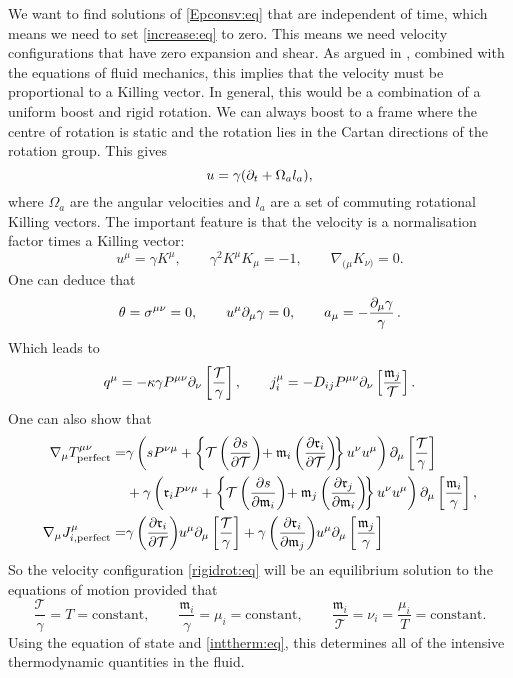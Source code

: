 \documentclass[12pt]{article}
\newcommand{\tloc}{\mathcal{T}}
\newcommand{\rl}{\mathfrak{r}}
\newcommand{\ml}{\mathfrak{m}}
\newcommand{\mg}{\mu}
\begin{document}
We want to find solutions of \eqref{Epconsv:eq} that are independent of time, which means we need to set \eqref{increase:eq} to zero.
This means we need velocity configurations that have zero expansion and shear.
As argued in \cite{Caldarelli:2008mv}, combined with the equations of fluid mechanics, this implies that the velocity must be proportional to a Killing vector.
In general, this would be a combination of a uniform boost and rigid rotation.
We can always boost to a frame where the centre of rotation is static and the rotation lies in the Cartan directions of the rotation group. This gives
%
\begin{equation}\label{rigidrot:eq}
  u = \gamma(\partial_t + \Omega_a l_a),
\end{equation}
%
where $\Omega_a$ are the angular velocities and $l_a$ are a set of commuting rotational Killing vectors. The important feature is that the velocity is a normalisation factor times a Killing vector:
%
\begin{equation}\label{eqvel:eq}
  u^\mu = \gamma K^\mu, \qquad
  \gamma^2 K^\mu K_\mu = -1, \qquad
  \nabla_{(\mu} K_{\nu)} = 0.
\end{equation}
%
One can deduce that
%
\begin{equation}\label{rotvelder:eq}
  \theta = \sigma^{\mu\nu}=0, \qquad
  u^\mu \partial_\mu \gamma = 0, \qquad
  a_\mu = -\frac{\partial_\mu \gamma}{\gamma}\,.
\end{equation}
%
Which leads to
%
\begin{equation*}
  q^\mu = -\kappa \gamma P^{\mu\nu} \p_\nu \brk{\frac{\tloc}{\gamma}}, \qquad
  j^\mu_i = -D_{ij} P^{\mu\nu} \p_\nu \brk{\frac{\ml_j}{\tloc}}.
\end{equation*}
%
One can also show that
%
\begin{equation*}
\begin{split}
  \nabla_\mu T^{\mu\nu}_\mathrm{perfect} =&
    \gamma \prn{s P^{\nu\mu}
        + \brc{\tloc \pdiffc{s}{\tloc} + \ml_i \pdiffc{\rl_i}{\tloc}} u^\nu u^\mu}
       \p_\mu \brk{\frac{\tloc}{\gamma}}\\
   &+\gamma \prn{\rl_i P^{\nu\mu}
        + \brc{\tloc \pdiffc{s}{\ml_i} + \ml_j \pdiffc{\rl_j}{\ml_i}} u^\nu u^\mu}
       \p_\mu \brk{\frac{\ml_i}{\gamma}},\\
  \nabla_\mu J^\mu_{i,\text{perfect}} =&
   \gamma \pdiffc{\rl_i}{\tloc} u^\mu\p_\mu \brk{\frac{\tloc}{\gamma}}
   + \gamma \pdiffc{\rl_i}{\ml_j} u^\mu\p_\mu \brk{\frac{\ml_j}{\gamma}}
\end{split}
\end{equation*}
%
So the velocity configuration \eqref{rigidrot:eq} will be an equilibrium solution to the equations of motion provided that
%
\begin{equation}\label{rotsol:eq}
  \frac{\tloc}{\gamma} = T = \text{constant}, \qquad
  \frac{\ml_i}{\gamma} = \mg_i = \text{constant}, \qquad
  \frac{\ml_i}{\tloc} = \nu_i = \frac{\mg_i}{T} = \text{constant}.
\end{equation}
%
Using the equation of state and \eqref{inttherm:eq}, this determines all of the intensive thermodynamic quantities in the fluid.
\end{document}
